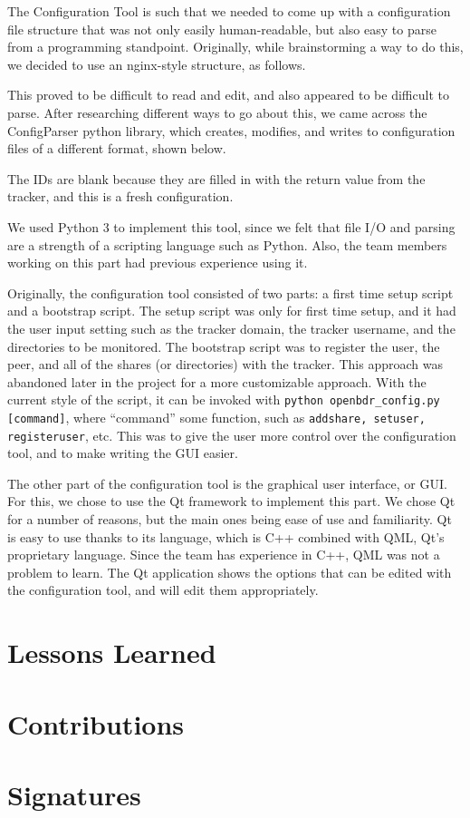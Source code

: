 \documentclass[12 pt]{article}
\begin{document}
	The Configuration Tool is such that we needed to come up with a configuration file structure that was not only easily human-readable, but also easy to parse from a programming standpoint. Originally, while brainstorming a way to do this, we decided to use an nginx-style structure, as follows.
	
	
	
	This proved to be difficult to read and edit, and also appeared to be difficult to parse. After researching different ways to go about this, we came across the ConfigParser python library, which creates, modifies, and writes to configuration files of a different format, shown below.
	
	
	
	The IDs are blank because they are filled in with the return value from the tracker, and this is a fresh configuration. 
	
	We used Python 3 to implement this tool, since we felt that file I/O and parsing are a strength of a scripting language such as Python. Also, the team members working on this part had previous experience using it.
	
	Originally, the configuration tool consisted of two parts: a first time setup script and a bootstrap script. The setup script was only for first time setup, and it had the user input setting such as the tracker domain, the tracker username, and the directories to be monitored. The bootstrap script was to register the user, the peer, and all of the shares (or directories) with the tracker. This approach was abandoned later in the project for a more customizable approach. With the current style of the script, it can be invoked with \texttt{python openbdr\_config.py [command]}, where ``command'' some function, such as \texttt{addshare, setuser, registeruser}, etc. This was to give the user more control over the configuration tool, and to make writing the GUI easier.
	
	The other part of the configuration tool is the graphical user interface, or GUI. For this, we chose to use the Qt framework to implement this part. We chose Qt for a number of reasons, but the main ones being ease of use and familiarity. Qt is easy to use thanks to its language, which is C++ combined with QML, Qt's proprietary language. Since the team has experience in C++, QML was not a problem to learn. The Qt application shows the options that can be edited with the configuration tool, and will edit them appropriately.
	
	\section{Lessons Learned}
	
	\section{Contributions}
	
	\section{Signatures}
\end{document}
